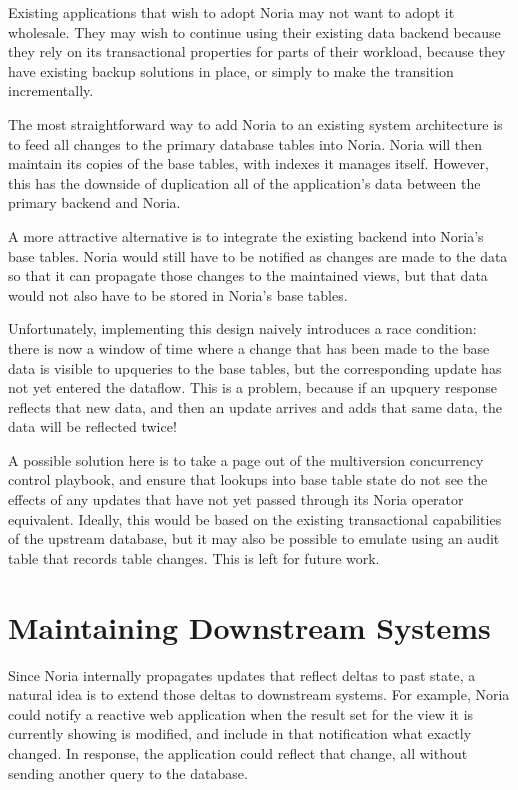 Existing applications that wish to adopt Noria may not want to adopt it
wholesale. They may wish to continue using their existing data backend because
they rely on its transactional properties for parts of their workload, because
they have existing backup solutions in place, or simply to make the transition
incrementally.

The most straightforward way to add Noria to an existing system architecture is
to feed all changes to the primary database tables into Noria. Noria will then
maintain its copies of the base tables, with indexes it manages itself. However,
this has the downside of duplication all of the application's data between the
primary backend and Noria.

A more attractive alternative is to integrate the existing backend into Noria's
base tables. Noria would still have to be notified as changes are made to the
data so that it can propagate those changes to the maintained views, but that
data would not also have to be stored in Noria's base tables.

Unfortunately, implementing this design naively introduces a race condition:
there is now a window of time where a change that has been made to the base data
is visible to upqueries to the base tables, but the corresponding update has not
yet entered the dataflow. This is a problem, because if an upquery response
reflects that new data, and then an update arrives and adds that same data, the
data will be reflected twice!

A possible solution here is to take a page out of the multiversion concurrency
control playbook, and ensure that lookups into base table state do not see the
effects of any updates that have not yet passed through its Noria operator
equivalent. Ideally, this would be based on the existing transactional
capabilities of the upstream database, but it may also be possible to emulate
using an audit table that records table changes. This is left for future work.

\section{Maintaining Downstream Systems}

Since Noria internally propagates updates that reflect deltas to past state, a
natural idea is to extend those deltas to downstream systems. For example, Noria
could notify a reactive web application when the result set for the view it is
currently showing is modified, and include in that notification what exactly
changed. In response, the application could reflect that change, all without
sending another query to the database.

